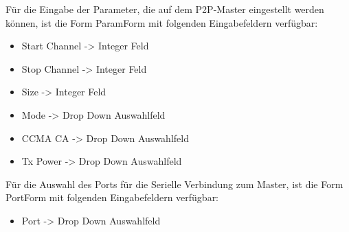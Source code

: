 Für die Eingabe der Parameter, die auf dem P2P-Master eingestellt werden können, ist die Form ParamForm mit folgenden Eingabefeldern verfügbar:
\begin{itemize}
	\item Start Channel \hspace{5mm} -> Integer Feld
	\item Stop Channel \hspace{6mm} -> Integer Feld
	\item Size \hspace{22.3mm} -> Integer Feld
	\item Mode \hspace{19.5mm} -> Drop Down Auswahlfeld
	\item CCMA CA \hspace{10mm} -> Drop Down Auswahlfeld
	\item Tx Power \hspace{13mm} -> Drop Down Auswahlfeld
\end{itemize}

\vspace{3mm}
Für die Auswahl des Ports für die Serielle Verbindung zum Master, ist die Form PortForm mit folgenden Eingabefeldern verfügbar:
\begin{itemize}
	\item  Port \hspace{22mm} -> Drop Down Auswahlfeld
\end{itemize}


